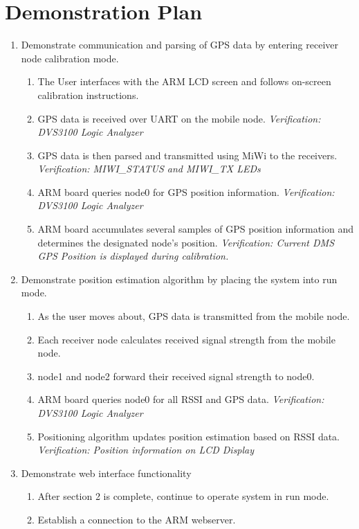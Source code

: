 \documentclass[10pt,letterpaper]{article}
\begin{document}
\section*{Demonstration Plan}
\begin{enumerate}
\item Demonstrate communication and parsing of GPS data by entering receiver node calibration mode.
	\begin{enumerate}
	\item The User interfaces with the ARM LCD screen and follows on-screen calibration instructions.
	\item GPS data is received over UART on the mobile node.  \textit{Verification: DVS3100 Logic Analyzer}
	\item GPS data is then parsed and transmitted using MiWi to the receivers. \textit{Verification: MIWI\_STATUS and MIWI\_TX LEDs}
	\item ARM board queries node0 for GPS position information. \textit{Verification: DVS3100 Logic Analyzer }
	\item ARM board accumulates several samples of GPS position information and determines the designated node's position. \textit{Verification: Current DMS GPS Position is displayed during calibration.}
	\end{enumerate}
\item Demonstrate position estimation algorithm by placing the system into run mode.
	\begin{enumerate}
	\item As the user moves about, GPS data is transmitted from the mobile node.
	\item Each receiver node calculates received signal strength from the mobile node.
	\item node1 and node2 forward their received signal strength to node0.
	\item ARM board queries node0 for all RSSI and GPS data. \textit{Verification: DVS3100 Logic Analyzer}
	\item Positioning algorithm updates position estimation based on RSSI data. \textit{Verification: Position information on LCD Display}
	\end{enumerate}
\item Demonstrate web interface functionality
	\begin{enumerate}
	\item After section 2 is complete, continue to operate system in run mode.
	\item Establish a connection to the ARM webserver.

\end{enumerate}
\end{enumerate}
\end{document}
